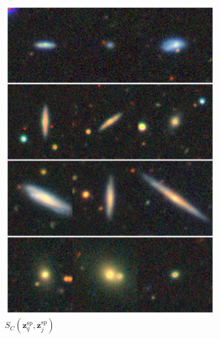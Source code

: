 \documentclass[a4paper,12pt]{article}
\begin{document}
\begin{figure}[H]
\begin{subfigure}{0.22\textwidth}
        \includegraphics[height=0.21\textheight]{../figures/images_sp_sp.png}
        \caption{$S_C(\mathbf{z}_q^{\text{sp}}, \mathbf{z}_j^{\text{sp}})$}
        \label{fig:retrieval_3}
    \end{subfigure}%
    \hfill
    \begin{subfigure}{0.22\textwidth}
        \centering

\end{subfigure}
\end{figure}
\end{document}
